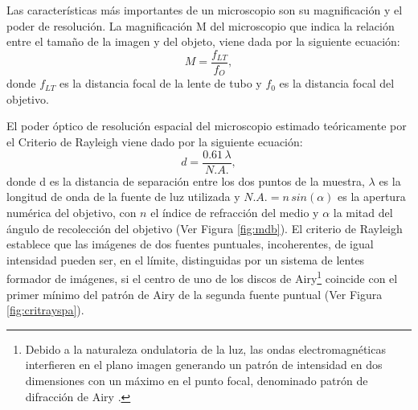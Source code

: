Las características más importantes de un microscopio son su magnificación y el poder de resolución. La magnificación M del microscopio que indica la relación entre el tamaño de la imagen y del objeto, viene dada por la siguiente ecuación:
\begin{equation}
M = \frac{f_{LT}}{f_{O}},
\end{equation}	
donde $f_{LT}$ es la distancia focal de la lente de tubo y $f_{0}$ es la distancia focal del objetivo.

El poder óptico de resolución espacial del microscopio estimado teóricamente por el Criterio de Rayleigh viene dado por la siguiente ecuación:
\begin{equation}
d = \frac{0.61 \hspace{2pt} \lambda}{ N.A.},
\end{equation}
donde d es la distancia de separación entre los dos puntos de la muestra, $\lambda$ es la longitud de onda de la fuente de luz utilizada y $N.A. = n \hspace{2pt} sin(\alpha)$ es la apertura numérica del objetivo, con $n$ el índice de refracción del medio y $\alpha$ la mitad del ángulo de recolección del objetivo (Ver Figura \ref{fig:mdb}). El criterio de Rayleigh establece que las imágenes de dos fuentes puntuales, incoherentes, de igual intensidad pueden ser, en el límite, distinguidas por un sistema de lentes formador de imágenes, si el centro de uno de los discos de Airy\footnote{Debido a la naturaleza ondulatoria de la luz, las ondas
electromagnéticas interfieren en el plano imagen generando un patrón de intensidad en dos dimensiones con
un máximo en el punto focal, denominado patrón de difracción de Airy \cite{hecht2012optics}.} coincide con el primer mínimo del patrón de Airy de la segunda fuente puntual (Ver Figura \ref{fig:critrayspa}).

